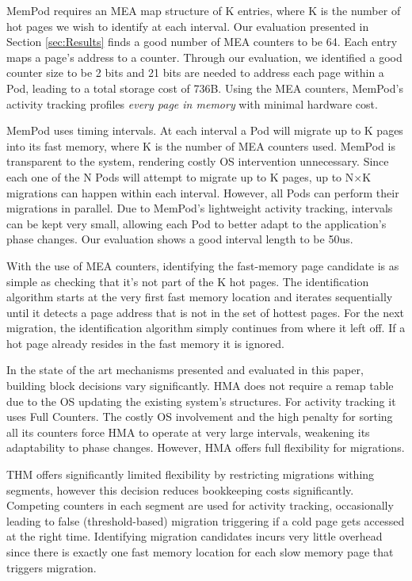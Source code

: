MemPod requires an MEA map structure of K entries, where K is the number of hot pages we wish to identify at each interval. Our evaluation presented in Section \ref{sec:Results} finds a good number of MEA counters to be 64. Each entry maps a page's address to a counter. Through our evaluation, we identified a good counter size to be 2 bits and 21 bits are needed to address each page within a Pod, leading to a total storage cost of 736B. Using the MEA counters, MemPod's activity tracking profiles \textit{every page in memory} with minimal hardware cost. 

MemPod uses timing intervals. At each interval a Pod will migrate up to K pages into its fast memory, where K is the number of MEA counters used. MemPod is transparent to the system, rendering costly OS intervention unnecessary. Since each one of the N Pods will attempt to migrate up to K pages, up to N$\times$K migrations can happen within each interval. However, all Pods can perform their migrations in parallel. Due to MemPod's lightweight activity tracking, intervals can be kept very small, allowing each Pod to better adapt to the application's phase changes. Our evaluation shows a good interval length to be 50us.

With the use of MEA counters, identifying the fast-memory page candidate is as simple as checking that it's not part of the K hot pages. The identification algorithm starts at the very first fast memory location and iterates sequentially until it detects a page address that is not in the set of hottest pages. For the next migration, the identification algorithm simply continues from where it left off. If a hot page already resides in the fast memory it is ignored.

In the state of the art mechanisms presented and evaluated in this paper, building block decisions vary significantly. HMA does not require a remap table due to the OS updating the existing system's structures. For activity tracking it uses Full Counters. The costly OS involvement and the high penalty for sorting all its counters force HMA to operate at very large intervals, weakening its adaptability to phase changes. However, HMA offers full flexibility for migrations.

THM offers significantly limited flexibility by restricting migrations withing segments, however this decision reduces bookkeeping costs significantly. Competing counters in each segment are used for activity tracking, occasionally leading to false (threshold-based) migration triggering if a cold page gets accessed at the right time. Identifying migration candidates incurs very little overhead since there is exactly one fast memory location for each slow memory page that triggers migration.


